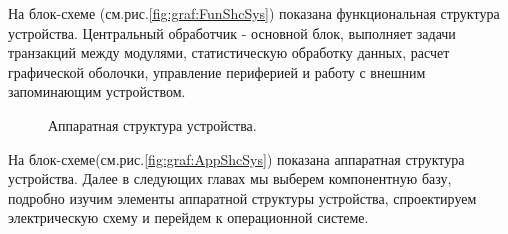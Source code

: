  На блок-схеме (см.рис.\ref{fig:graf:FunShcSys}) показана функциональная структура устройства. Центральный обработчик - основной блок, выполняет  задачи транзакций между модулями, статистическую обработку данных, расчет графической оболочки, управление периферией и работу с внешним запоминающим устройством.

\begin{sidewaysfigure}[p]

\centerline{}

\caption{Аппаратная структура устройства.}
\label{fig:graf:AppShcSys}

\label{label_this_fig}

\end{sidewaysfigure}
На блок-схеме(см.рис.\ref{fig:graf:AppShcSys}) показана аппаратная структура устройства.
Далее в следующих главах мы выберем компонентную базу, подробно изучим элементы аппаратной структуры устройства, спроектируем электрическую схему и перейдем к операционной системе.